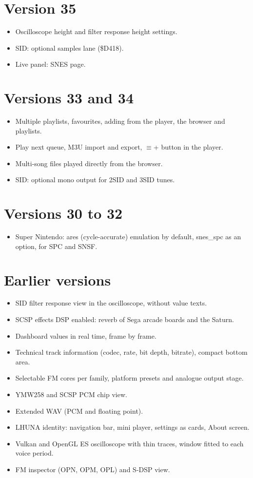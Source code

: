 \section*{Version 35}
\begin{itemize}
  \item Oscilloscope height and filter response height settings.
  \item SID: optional samples lane (\$D418).
  \item Live panel: SNES page.
\end{itemize}
\section*{Versions 33 and 34}
\begin{itemize}
  \item Multiple playlists, favourites, adding from the player, the browser and playlists.
  \item Play next queue, M3U import and export, $\equiv$+ button in the player.
  \item Multi-song files played directly from the browser.
  \item SID: optional mono output for 2SID and 3SID tunes.
\end{itemize}
\section*{Versions 30 to 32}
\begin{itemize}
  \item Super Nintendo: ares (cycle-accurate) emulation by default, snes\_spc as an option, for SPC and SNSF.
\end{itemize}
\section*{Earlier versions}
\begin{itemize}
  \item SID filter response view in the oscilloscope, without value texts.
  \item SCSP effects DSP enabled: reverb of Sega arcade boards and the Saturn.
  \item Dashboard values in real time, frame by frame.
  \item Technical track information (codec, rate, bit depth, bitrate), compact bottom area.
  \item Selectable FM cores per family, platform presets and analogue output stage.
  \item YMW258 and SCSP PCM chip view.
  \item Extended WAV (PCM and floating point).
  \item LHUNA identity: navigation bar, mini player, settings as cards, About screen.
  \item Vulkan and OpenGL ES oscilloscope with thin traces, window fitted to each voice period.
  \item FM inspector (OPN, OPM, OPL) and S-DSP view.
\end{itemize}
